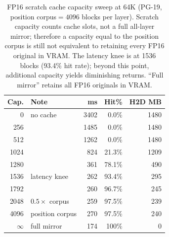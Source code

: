 \documentclass[10pt,twocolumn,a4paper]{article}
\theoremstyle{definition}
\theoremstyle{remark}
\begin{document}
\begin{table}[ht]
\centering
\caption{FP16 scratch cache capacity sweep at 64K (PG-19, position corpus${}=4096$ blocks per layer).  Scratch capacity counts cache slots, not a full all-layer mirror; therefore a capacity equal to the position corpus is still not equivalent to retaining every FP16 original in VRAM\@.  The latency knee is at 1536 blocks (93.4\% hit rate); beyond this point, additional capacity yields diminishing returns.  ``Full mirror'' retains all FP16 originals in VRAM\@.}
\label{tab:cache_sweep_64k}
\scriptsize
\begin{tabular}{rlrrr}
\toprule
\textbf{Cap.} & \textbf{Note} & \textbf{ms} & \textbf{Hit\%} & \textbf{H2D MB} \\
\midrule
0       & no cache       & 3402 & 0.0\%   & 1480 \\
256     &                & 1485 & 0.0\%   & 1480 \\
512     &                & 1262 & 0.0\%   & 1480 \\
1024    &                & 824  & 21.3\%  & 1209 \\
1280    &                & 361  & 78.1\%  & 490 \\
\rowcolor[gray]{0.92}
1536    & latency knee   & 262  & 93.4\%  & 295 \\
1792    &                & 260  & 96.7\%  & 245 \\
2048    & $0.5\times$ corpus & 259 & 97.5\% & 239 \\
4096    & position corpus & 270 & 97.5\% & 240 \\
\rowcolor[gray]{0.92}
$\infty$ & full mirror  & 174  & 100\%   & 0 \\
\bottomrule
\end{tabular}
\end{table}
\end{document}

